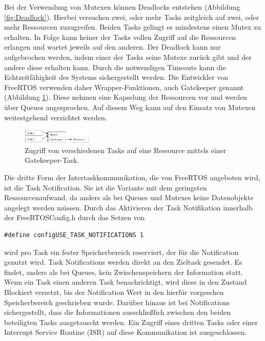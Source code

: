 Bei der Verwendung von Mutexen können Deadlocks entstehen (Abbildung \ref{fig:Deadlock}). Hierbei versuchen zwei, oder mehr Tasks zeitgleich auf zwei, oder mehr Ressourcen zuzugreifen. Beiden Tasks gelingt es mindestens einen Mutex zu erhalten. In Folge kann keiner der Tasks vollen Zugriff auf die Ressourcen erlangen und wartet jeweils auf den anderen. Der Deadlock kann nur aufgebrochen werden, indem einer der Tasks seine Mutexe zurück gibt und der andere diese erhalten kann\cite[p.243ff]{MasteringFreeRtos}. 
Durch die notwendigen Timeouts kann die Echt\-zeit\-fähig\-keit des Systems sichergestellt werden. 
Die Entwickler von FreeRTOS verwenden daher Wrapper-Funktionen, auch Gatekeeper genannt (Abbildung \ref{fig:Gatekeeper}). Diese nehmen eine Kapselung der Ressourcen vor und werden über Queues angesprochen. Auf diesem Weg kann auf den Einsatz von Mutexen weitestgehend verzichtet werden\cite[p.259ff]{MasteringFreeRtos}.
\begin{figure}[ht!]
	\centering
		\includegraphics[width=0.3\textwidth]{Pictures/Intertask/Gatekeeper.png}
	\caption{Zugriff von verschiedenen Tasks auf eine Ressource mittels einer Gatekeeper-Task.}
	\label{fig:Gatekeeper}
\end{figure}
Die dritte Form der Intertaskkommunikation, die von FreeRTOS angeboten wird, ist die Task Notification. Sie ist die Variante mit dem geringsten Ressourcenaufwand, da anders als bei Queues und Mutexes keine Datenobjekte angelegt werden müssen. Durch das Aktivieren der Task Notifikation innerhalb der FreeRTOSConfig.h durch das Setzen von 
\begin{lstlisting}[numbers = none]
#define configUSE_TASK_NOTIFICATIONS 1
\end{lstlisting}
wird pro Task ein fester Speicherbereich reserviert, der für die Notification genutzt wird. Task Notifications werden direkt an den Zieltask gesendet. Es findet, anders als bei Queues, kein Zwischenspeichern der Information statt. Wenn ein Task einen anderen Task benachrichtigt, wird diese in den Zustand Blockiert versetzt, bis der Notification Wert in den hierfür vorgesehen Speicherbereich geschrieben wurde. Darüber hinaus ist bei Notifications sichergestellt, dass die Informationen ausschließlich zwischen den beiden beteiligten Tasks ausgetauscht werden. Ein Zugriff eines dritten Tasks oder einer Interrupt Service Routine (ISR) auf diese Kommunikation ist ausgeschlossen\cite[p.293ff]{MasteringFreeRtos}.

